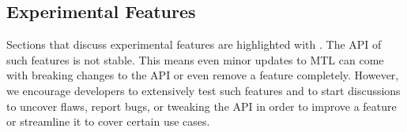 \subsection{Experimental Features}

Sections that discuss experimental features are highlighted with \experimental.
The API of such features is not stable. This means even minor updates to MTL
can come with breaking changes to the API or even remove a feature completely.
However, we encourage developers to extensively test such features and to start
discussions to uncover flaws, report bugs, or tweaking the API in order to
improve a feature or streamline it to cover certain use cases.
